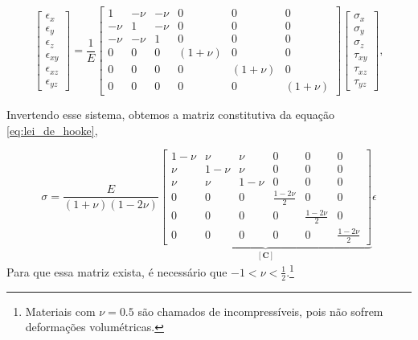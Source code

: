 \begin{equation}
    \begin{bmatrix}
        \epsilon_x \\
        \epsilon_y \\
        \epsilon_z \\
        \epsilon_{xy} \\
        \epsilon_{xz} \\
        \epsilon_{yz}
    \end{bmatrix}
    =
    \frac{1}{E}
    \begin{bmatrix}
        1 & -\nu & -\nu & 0 & 0 & 0 \\
        -\nu & 1 & -\nu & 0 & 0 & 0 \\
        -\nu & -\nu & 1 & 0 & 0 & 0 \\
        0 & 0 & 0 & (1+\nu) & 0 & 0 \\
        0 & 0 & 0 & 0 & (1+\nu) & 0 \\
        0 & 0 & 0 & 0 & 0 & (1+\nu)
    \end{bmatrix}
    \begin{bmatrix}
        \sigma_x \\
        \sigma_y \\
        \sigma_z \\
        \tau_{xy} \\
        \tau_{xz} \\
        \tau_{yz}
    \end{bmatrix},
    \label{eq:lei_de_hooke_generalizada_matricial}
\end{equation}

Invertendo esse sistema, obtemos a matriz constitutiva da equação \ref{eq:lei_de_hooke},

\begin{equation}
    {\sigma} = \frac{E}{(1+\nu)(1-2\nu)}
    \underbrace{\begin{bmatrix} 1-\nu & \nu & \nu & 0 & 0 & 0 \\
        \nu & 1-\nu & \nu & 0 & 0 & 0 \\
        \nu & \nu & 1-\nu & 0 & 0 & 0 \\
        0 & 0 & 0 & \frac{1-2\nu}{2} & 0 & 0 \\
        0 & 0 & 0 & 0 & \frac{1-2\nu}{2} & 0 \\
        0 & 0 & 0 & 0 & 0 & \frac{1-2\nu}{2} 
    \end{bmatrix}}_{[\bm{C}]}
    {\epsilon}
\end{equation}
Para que essa matriz exista, é necessário que $-1 < \nu < \frac{1}{2}$.\footnote{Materiais com $\nu = 0.5$ são chamados de incompressíveis, pois não sofrem deformações volumétricas.}

